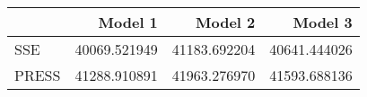\begin{tabular}{lrrr}
\toprule
{} &       Model 1 &       Model 2 &       Model 3 \\
\midrule
SSE   &  40069.521949 &  41183.692204 &  40641.444026 \\
PRESS &  41288.910891 &  41963.276970 &  41593.688136 \\
\bottomrule
\end{tabular}
